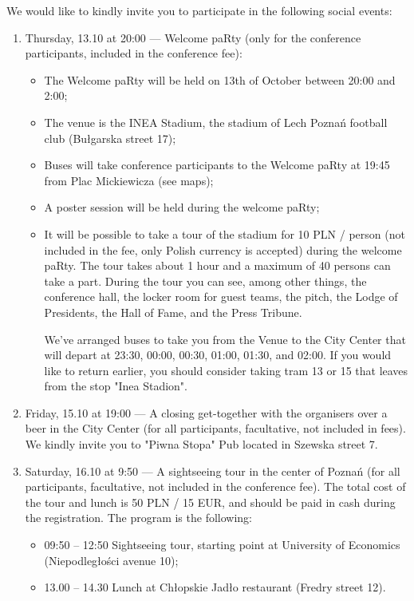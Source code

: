 We would like to kindly invite you to participate in the following social events:

\begin{enumerate}
        \item Thursday, 13.10 at 20:00 — Welcome paRty (only for the conference participants, included in the conference fee):
        
        \begin{itemize}
                \item The Welcome paRty will be held on 13th of October between 20:00 and 2:00;
                \item The venue is the INEA Stadium, the stadium of Lech Poznań football club (Bułgarska street 17);
                \item Buses will take conference participants to the Welcome paRty at 19:45 from Plac Mickiewicza (see maps);
                \item A poster session will be held during the welcome paRty;
                \item It will be possible to take a tour of the stadium for 10 PLN / person (not included in the fee, only Polish currency is accepted) during the welcome paRty. The tour takes about 1 hour and a maximum of 40 persons can take a part. During the tour you can see, among other things, the conference hall, the locker room for guest teams, the pitch, the Lodge of Presidents, the Hall of Fame, and the Press Tribune.
        
        We've arranged buses to take you from the Venue to the City Center that will depart at 23:30, 00:00, 00:30, 01:00, 01:30, and 02:00. If you would like to return earlier, you should consider taking tram 13 or 15 that leaves from the stop "Inea Stadion". 
        
        \end{itemize}
        
        \item Friday, 15.10 at 19:00 — A closing get-together with the organisers over a beer in the City Center (for all participants, facultative, not included in fees). We kindly invite you to "Piwna Stopa" Pub located in Szewska street 7.
        \item Saturday, 16.10 at 9:50 — A sightseeing tour in the center of Poznań (for all participants, facultative, not included in the conference fee). The total cost of the tour and lunch is 50 PLN / 15 EUR, and should be paid in cash during the registration. The program is the following:
        
        \begin{itemize}
                \item 09:50 – 12:50 Sightseeing tour, starting point at University of Economics (Niepodległości avenue 10);
                \item 13.00 – 14.30 Lunch at Chłopskie Jadło restaurant (Fredry street 12).
        \end{itemize}

\end{enumerate}
